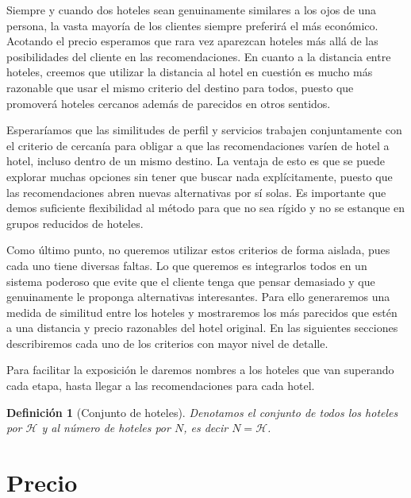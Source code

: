 \documentclass[12pt]{report}
\newcommand{\HH}{\mathcal{H}}
\newtheorem{defn}{Definici\'on}[chapter]
\begin{document}
Siempre y cuando dos hoteles sean genuinamente similares a los ojos de una persona, la vasta mayoría de los clientes siempre preferirá el más económico. Acotando el precio esperamos que rara vez aparezcan hoteles más allá de las posibilidades del cliente en las recomendaciones. En cuanto a la distancia entre hoteles, creemos que utilizar la distancia al hotel en cuestión es mucho más razonable que usar el mismo criterio del destino para todos, puesto que promoverá hoteles cercanos además de parecidos en otros sentidos.

Esperaríamos que las similitudes de perfil y servicios trabajen conjuntamente con el criterio de cercanía para obligar a que las recomendaciones varíen de hotel a hotel, incluso dentro de un mismo destino. La ventaja de esto es que se puede explorar muchas opciones sin tener que buscar nada explícitamente, puesto que las recomendaciones abren nuevas alternativas por sí solas. Es importante que demos suficiente flexibilidad al método para que no sea rígido y no se estanque en grupos reducidos de hoteles.

Como último punto, no queremos utilizar estos criterios de forma aislada, pues cada uno tiene diversas faltas. Lo que queremos es integrarlos todos en un sistema poderoso que evite que el cliente tenga que pensar demasiado y que genuinamente le proponga alternativas interesantes. Para ello generaremos una medida de similitud entre los hoteles y mostraremos los más parecidos que estén a una distancia y precio razonables del hotel original. En las siguientes secciones describiremos cada uno de los criterios con mayor nivel de detalle.

Para facilitar la exposición le daremos nombres a los hoteles que van superando cada etapa, hasta llegar a las recomendaciones para cada hotel.
\begin{defn}[Conjunto de hoteles]
Denotamos el conjunto de todos los hoteles por $\HH$ y al número de hoteles por $N$, es decir $N = \HH$.
\end{defn}

\section{Precio}
\end{document}
